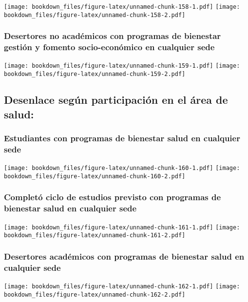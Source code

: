 \documentclass[]{article}
\theoremstyle{definition}
\theoremstyle{definition}
\theoremstyle{definition}
\theoremstyle{remark}
\begin{document}
\texttt{[image: bookdown\_files/figure-latex/unnamed-chunk-158-1.pdf]}
\texttt{[image: bookdown\_files/figure-latex/unnamed-chunk-158-2.pdf]}

\subsubsection{Desertores no académicos con programas de bienestar
gestión y fomento socio-económico en cualquier
sede}\label{desertores-no-academicos-con-programas-de-bienestar-gestion-y-fomento-socio-economico-en-cualquier-sede}

\texttt{[image: bookdown\_files/figure-latex/unnamed-chunk-159-1.pdf]}
\texttt{[image: bookdown\_files/figure-latex/unnamed-chunk-159-2.pdf]}

\subsection{Desenlace según participación en el área de
salud:}\label{desenlace-segun-participacion-en-el-area-de-salud}

\subsubsection{Estudiantes con programas de bienestar salud en cualquier
sede}\label{estudiantes-con-programas-de-bienestar-salud-en-cualquier-sede}

\texttt{[image: bookdown\_files/figure-latex/unnamed-chunk-160-1.pdf]}
\texttt{[image: bookdown\_files/figure-latex/unnamed-chunk-160-2.pdf]}

\subsubsection{Completó ciclo de estudios previsto con programas de
bienestar salud en cualquier
sede}\label{completo-ciclo-de-estudios-previsto-con-programas-de-bienestar-salud-en-cualquier-sede}

\texttt{[image: bookdown\_files/figure-latex/unnamed-chunk-161-1.pdf]}
\texttt{[image: bookdown\_files/figure-latex/unnamed-chunk-161-2.pdf]}

\subsubsection{Desertores académicos con programas de bienestar salud en
cualquier
sede}\label{desertores-academicos-con-programas-de-bienestar-salud-en-cualquier-sede}

\texttt{[image: bookdown\_files/figure-latex/unnamed-chunk-162-1.pdf]}
\texttt{[image: bookdown\_files/figure-latex/unnamed-chunk-162-2.pdf]}
\end{document}
